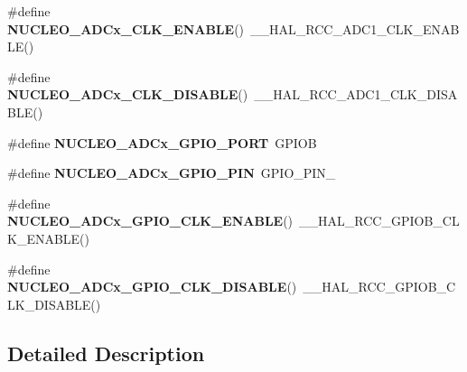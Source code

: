 \begin{DoxyCompactItemize}
\#define {\bfseries N\+U\+C\+L\+E\+O\+\_\+\+A\+D\+Cx\+\_\+\+C\+L\+K\+\_\+\+E\+N\+A\+B\+LE}()~\+\_\+\+\_\+\+H\+A\+L\+\_\+\+R\+C\+C\+\_\+\+A\+D\+C1\+\_\+\+C\+L\+K\+\_\+\+E\+N\+A\+B\+LE()
\item 
\mbox{\label{group___s_t_m32_f0_x_x___n_u_c_l_e_o___b_u_s_ga844f451476f05cf2d65b477529f050e2}} 
\#define {\bfseries N\+U\+C\+L\+E\+O\+\_\+\+A\+D\+Cx\+\_\+\+C\+L\+K\+\_\+\+D\+I\+S\+A\+B\+LE}()~\+\_\+\+\_\+\+H\+A\+L\+\_\+\+R\+C\+C\+\_\+\+A\+D\+C1\+\_\+\+C\+L\+K\+\_\+\+D\+I\+S\+A\+B\+LE()
\item 
\mbox{\label{group___s_t_m32_f0_x_x___n_u_c_l_e_o___b_u_s_ga719b17b1934a77d1fbc737cf4b26ed3b}} 
\#define {\bfseries N\+U\+C\+L\+E\+O\+\_\+\+A\+D\+Cx\+\_\+\+G\+P\+I\+O\+\_\+\+P\+O\+RT}~G\+P\+I\+OB
\item 
\mbox{\label{group___s_t_m32_f0_x_x___n_u_c_l_e_o___b_u_s_gada3ee00a6e2db2f43e86be36a447da4e}} 
\#define {\bfseries N\+U\+C\+L\+E\+O\+\_\+\+A\+D\+Cx\+\_\+\+G\+P\+I\+O\+\_\+\+P\+IN}~G\+P\+I\+O\+\_\+\+P\+I\+N\+\_
\item 
\mbox{\label{group___s_t_m32_f0_x_x___n_u_c_l_e_o___b_u_s_ga49affb6ef5fd9996c12ad635f722ad63}} 
\#define {\bfseries N\+U\+C\+L\+E\+O\+\_\+\+A\+D\+Cx\+\_\+\+G\+P\+I\+O\+\_\+\+C\+L\+K\+\_\+\+E\+N\+A\+B\+LE}()~\+\_\+\+\_\+\+H\+A\+L\+\_\+\+R\+C\+C\+\_\+\+G\+P\+I\+O\+B\+\_\+\+C\+L\+K\+\_\+\+E\+N\+A\+B\+LE()
\item 
\mbox{\label{group___s_t_m32_f0_x_x___n_u_c_l_e_o___b_u_s_gae78aac94d46b96c1aa22f893a8bee19e}} 
\#define {\bfseries N\+U\+C\+L\+E\+O\+\_\+\+A\+D\+Cx\+\_\+\+G\+P\+I\+O\+\_\+\+C\+L\+K\+\_\+\+D\+I\+S\+A\+B\+LE}()~\+\_\+\+\_\+\+H\+A\+L\+\_\+\+R\+C\+C\+\_\+\+G\+P\+I\+O\+B\+\_\+\+C\+L\+K\+\_\+\+D\+I\+S\+A\+B\+LE()
\end{DoxyCompactItemize}


\subsection{Detailed Description}
